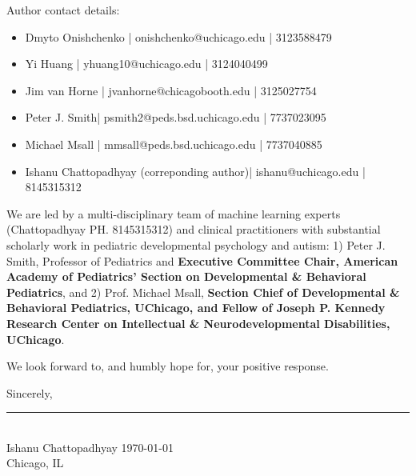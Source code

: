 \documentclass[9pt,onecolumn,compsoc]{IEEEtran}
\newcommand{\Space}{\vspace{10pt}}
\begin{document}
Author contact details:
\vspace{-10pt}

\begin{itemize}
\item Dmyto Onishchenko | onishchenko@uchicago.edu |
 3123588479
\item Yi Huang | yhuang10@uchicago.edu | 3124040499
\item Jim van Horne | jvanhorne@chicagobooth.edu | 3125027754
\item Peter J. Smith|  psmith2@peds.bsd.uchicago.edu | 7737023095
\item Michael Msall |  mmsall@peds.bsd.uchicago.edu | 7737040885
\item Ishanu Chattopadhyay (correponding author)|  ishanu@uchicago.edu | 8145315312
\end{itemize}

We are led by a multi-disciplinary team  of machine learning experts (Chattopadhyay PH. 8145315312) and clinical practitioners with substantial scholarly  work in pediatric developmental psychology and autism: 1) Peter J. Smith, Professor of Pediatrics and \textbf{Executive Committee Chair, American Academy of Pediatrics' Section on Developmental \& Behavioral
Pediatrics}, and 2) Prof. Michael Msall, \textbf{Section Chief of Developmental \& Behavioral Pediatrics, UChicago, and Fellow of Joseph  P. Kennedy Research Center on Intellectual \& Neurodevelopmental Disabilities, UChicago}.
 
 We look forward to, and humbly hope for, your positive  response.
\Space

Sincerely,
\vspace{-30pt}

% 
\begin{flushleft}
\vspace{-30pt}

\rule{2.5in}{1pt}\\
{\fontsize{10}{10}\selectfont Ishanu Chattopadhyay}
\hfill \today\\
Chicago, IL
\end{flushleft}

\end{document}
